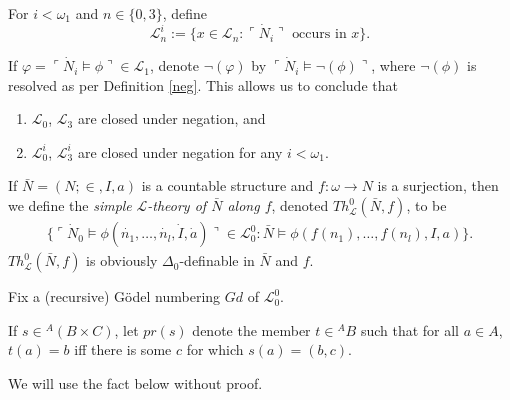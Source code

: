 \documentclass[12pt]{article}
\numberwithin{equation}{section}
\begin{document}
\begin{defi}
For $i < \omega_1$ and $n \in \{0, 3\}$, define 
\begin{equation*}
    \mathcal{L}^i_n := \{x \in \mathcal{L}_n : \ulcorner \dot{N}_i \urcorner \text{ occurs in } x\}.
\end{equation*}
\end{defi}

\begin{con}
If $\varphi = \ulcorner \dot{N}_i \models \phi \urcorner \in \mathcal{L}_1$, denote $\neg(\varphi)$ by $\ulcorner \dot{N}_i \models \neg(\phi) \urcorner$, where $\neg(\phi)$ is resolved as per Definition \ref{neg}. This allows us to conclude that 
\begin{enumerate}[label=(\alph*)]
    \item $\mathcal{L}_0$, $\mathcal{L}_3$ are closed under negation, and
    \item $\mathcal{L}^i_0$, $\mathcal{L}^i_3$ are closed under negation for any $i < \omega_1$.
\end{enumerate}
\end{con}

\begin{defi}
If $\bar{N} = (N; \in, I, a)$ is a countable structure and $f : \omega \longrightarrow N$ is a surjection, then we define the \emph{simple} $\mathcal{L}$\emph{-theory of $\bar{N}$ along $f$}, denoted $Th^{0}_{\mathcal{L}}(\bar{N}, f)$, to be 
\begin{align*}
    \{\ulcorner \dot{N}_0 \models \phi(\dot{n_1}, \ldots, \dot{n_l}, \dot{I}, \dot{a}) \urcorner \in \mathcal{L}^0_0 : \bar{N} \models \phi(f(n_1), \ldots, f(n_l), I, a)\}.
\end{align*}
$Th^{0}_{\mathcal{L}}(\bar{N}, f)$ is obviously $\Delta_0$-definable in $\bar{N}$ and $f$.
\end{defi}

Fix a (recursive) G\"{o}del numbering $Gd$ of $\mathcal{L}^0_0$.

\begin{defi}\label{nota4}
If $s \in {^{A}{(B \times C)}}$, let $pr(s)$ denote the member $t \in {^{A}{B}}$ such that for all $a \in A$, $t(a) = b$ iff there is some $c$ for which $s(a) = (b, c)$.
\end{defi}

We will use the fact below without proof.
\end{document}
